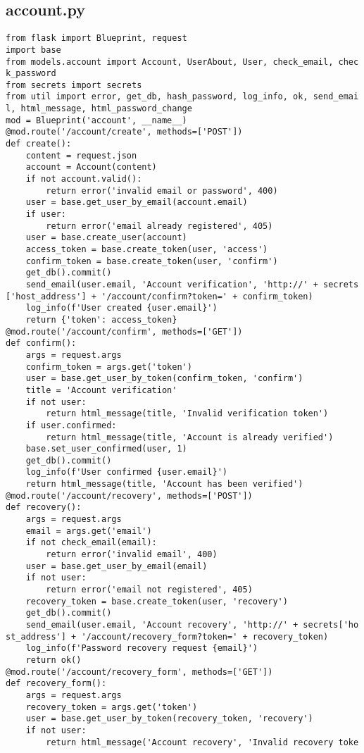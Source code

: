 \documentclass[listing]{espd}
\begin{document}
\subsection{account.py}
\begin{verbatim}
from flask import Blueprint, request
import base
from models.account import Account, UserAbout, User, check_email, chec
k_password
from secrets import secrets
from util import error, get_db, hash_password, log_info, ok, send_emai
l, html_message, html_password_change
mod = Blueprint('account', __name__)
@mod.route('/account/create', methods=['POST'])
def create():
    content = request.json
    account = Account(content)
    if not account.valid():
        return error('invalid email or password', 400)
    user = base.get_user_by_email(account.email)
    if user:
        return error('email already registered', 405)
    user = base.create_user(account)
    access_token = base.create_token(user, 'access')
    confirm_token = base.create_token(user, 'confirm')
    get_db().commit()
    send_email(user.email, 'Account verification', 'http://' + secrets
['host_address'] + '/account/confirm?token=' + confirm_token)
    log_info(f'User created {user.email}')
    return {'token': access_token}
@mod.route('/account/confirm', methods=['GET'])
def confirm():
    args = request.args
    confirm_token = args.get('token')
    user = base.get_user_by_token(confirm_token, 'confirm')
    title = 'Account verification'
    if not user:
        return html_message(title, 'Invalid verification token')
    if user.confirmed:
        return html_message(title, 'Account is already verified')
    base.set_user_confirmed(user, 1)
    get_db().commit()
    log_info(f'User confirmed {user.email}')
    return html_message(title, 'Account has been verified')
@mod.route('/account/recovery', methods=['POST'])
def recovery():
    args = request.args
    email = args.get('email')
    if not check_email(email):
        return error('invalid email', 400)
    user = base.get_user_by_email(email)
    if not user:
        return error('email not registered', 405)
    recovery_token = base.create_token(user, 'recovery')
    get_db().commit()
    send_email(user.email, 'Account recovery', 'http://' + secrets['ho
st_address'] + '/account/recovery_form?token=' + recovery_token)
    log_info(f'Password recovery request {email}')
    return ok()
@mod.route('/account/recovery_form', methods=['GET'])
def recovery_form():
    args = request.args
    recovery_token = args.get('token')
    user = base.get_user_by_token(recovery_token, 'recovery')
    if not user:
        return html_message('Account recovery', 'Invalid recovery toke

\end{verbatim}
\end{document}
